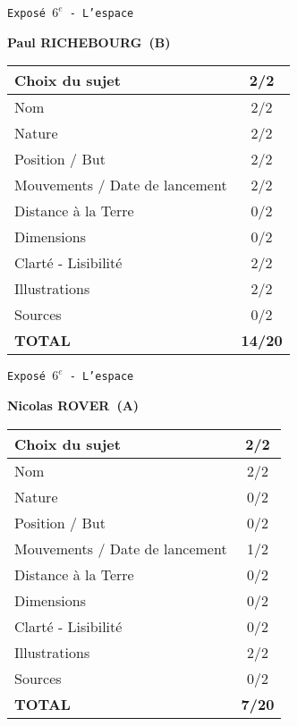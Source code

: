 	\vspace*{1cm}
	
	\newpage
	\LARGE{\texttt{Expos\'e $6^e$ - L'espace}}
	\vspace*{1cm}

	\textbf{Paul RICHEBOURG\ (B)}

	\vspace*{1.5cm}
	\begin{tabular}{|l|c|}
		\hline
		Choix du sujet & 2/2 \\
		\hline
		Nom & 2/2 \\
		\hline
		Nature & 2/2 \\
		\hline
		Position / But & 2/2 \\
		\hline
		Mouvements / Date de lancement & 2/2 \\
		\hline
		Distance \`a la Terre & 0/2 \\
		\hline
		Dimensions & 0/2 \\
		\hline
		Clart\'e - Lisibilit\'e & 2/2 \\
		\hline
		Illustrations & 2/2 \\
		\hline
		Sources & 0/2 \\
		\hline
		\textbf{TOTAL}  & \textbf{14/20} \\
		\hline
	\end{tabular}

	\vspace*{1cm}
	
	\newpage
	\LARGE{\texttt{Expos\'e $6^e$ - L'espace}}
	\vspace*{1cm}

	\textbf{Nicolas ROVER\ (A)}

	\vspace*{1.5cm}
	\begin{tabular}{|l|c|}
		\hline
		Choix du sujet & 2/2 \\
		\hline
		Nom & 2/2 \\
		\hline
		Nature & 0/2 \\
		\hline
		Position / But & 0/2 \\
		\hline
		Mouvements / Date de lancement & 1/2 \\
		\hline
		Distance \`a la Terre & 0/2 \\
		\hline
		Dimensions & 0/2 \\
		\hline
		Clart\'e - Lisibilit\'e & 0/2 \\
		\hline
		Illustrations & 2/2 \\
		\hline
		Sources & 0/2 \\
		\hline
		\textbf{TOTAL}  & \textbf{7/20} \\
		\hline
	\end{tabular}

